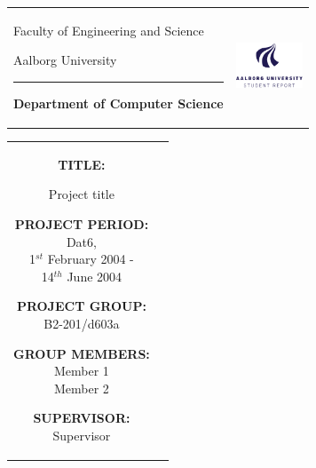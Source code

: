 \begin{titlepage}
\thispagestyle{empty}

\begin{nopagebreak}
{\samepage

\begin{tabular}{lr}
        \parbox{14.5cm}{
          {\LARGE Faculty of Engineering and Science}

          {\small Aalborg University}
          \vspace{-0.3cm}\\
        \hrule
        \vspace{0.2cm}
          {\bf Department of Computer Science}
         }   & \hspace{-2.0cm} \includegraphics[width=2cm]{graphics/aau_logo_en}
\end{tabular}

\begin{tabular}{cc}
\parbox{7cm}{
\hspace{2cm}
\begin{description}

\item {\bf TITLE:}

Project title 


\end{description}

\parbox{8cm}{

\begin{description}
        \item {\bf PROJECT PERIOD:}\\
          Dat6, \\
          1$^{st}$ February 2004 -\\ 14$^{th}$ June 2004\\
          \hspace{4cm}
        \item {\bf PROJECT GROUP:}\\
          B2-201/d603a\\
          \hspace{4cm}
        \item {\bf GROUP MEMBERS:}\\
          Member 1 \\
          Member 2 
          \hspace{2cm}
        \item {\bf SUPERVISOR:}\\
          Supervisor
\end{description}
}

}
\end{tabular}}
\end{nopagebreak}
\end{titlepage}

